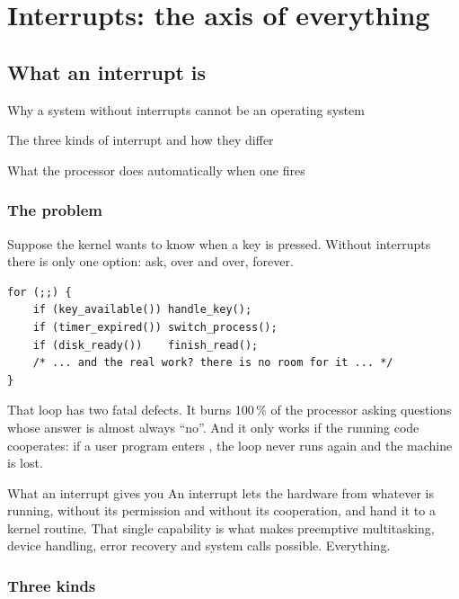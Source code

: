 \part{Interrupts: the axis of everything}

\chapter{What an interrupt is}

\begin{goals}
  \item Why a system without interrupts cannot be an operating system
  \item The three kinds of interrupt and how they differ
  \item What the processor does automatically when one fires
\end{goals}

\section{The problem}

Suppose the kernel wants to know when a key is pressed. Without interrupts there is only one
option: ask, over and over, forever.

\begin{lstlisting}[style=c]
for (;;) {
    if (key_available()) handle_key();
    if (timer_expired()) switch_process();
    if (disk_ready())    finish_read();
    /* ... and the real work? there is no room for it ... */
}
\end{lstlisting}

That loop has two fatal defects. It burns 100\,\% of the processor asking questions whose answer is
almost always ``no''. And it only works if the running code cooperates: if a user program enters
, the loop never runs again and the machine is lost.

\begin{concept}{What an interrupt gives you}
An interrupt lets the hardware  from whatever is running,
without its permission and without its cooperation, and hand it to a kernel routine. That single
capability is what makes preemptive multitasking, device handling, error recovery and system calls
possible. Everything.
\end{concept}

\section{Three kinds}

